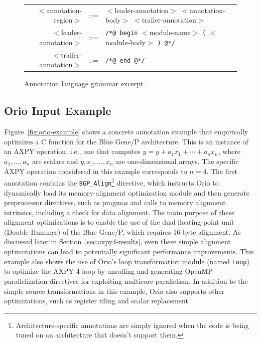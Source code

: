 \begin{figure}%
\begin{center} 
\begin{tabular}{rrl} 
$<$annotation-region$>$ & ::= & $<$leader-annotation$>$ $<$annotation-body$>$ $<$trailer-annotation$>$\\ 
$<$leader-annotation$>$ & ::= & \texttt{/*@ begin} $<$module-name$>$ \texttt{(} $<$module-body$>$ \texttt{) @*/} \\
$<$trailer-annotation$>$ & ::= & \texttt{/*@ end @*/} \\
\end{tabular} 
\end{center}  
\caption{Annotation language grammar excerpt.}  
\label{fig:ann-lang}
\end{figure}  

\subsection{Orio Input Example}
\label{sec:example}

Figure~\ref{fig:orio-example} shows a concrete annotation example that
empirically optimizes a C function for the Blue Gene/P
architecture. This is an instance of an AXPY operation, i.e., one that computes
$y=y+a_1 x_1+\cdots+a_n x_n$, where $a_1,\ldots,a_n$ are scalars and
$y,x_1,\ldots,x_n$ are one-dimensional arrays. The specific AXPY operation
considered in this example corresponds to $n=4$. The first annotation contains the
\texttt{BGP\_Align}\footnote{Architecture-specific annotations are simply ignored when the
code is being tuned on an architecture that doesn't support them.} directive,
which instructs Orio to dynamically load its memory-alignment optimization
module and then generate preprocessor directives, such as pragmas and calls
to memory alignment intrinsics, including a check for data alignment. The
main purpose of these alignment optimizations is to enable the use of the
dual floating-point unit (Double Hummer) of the Blue Gene/P, which requires
16-byte alignment. As discussed later in Section~\ref{sec:axpy4-results},
even these simple alignment optimizations can lead to potentially significant
performance improvements. This example also shows the use of Orio's loop
transformation module (named \texttt{Loop}) to optimize the AXPY-4 loop by
unrolling and generating OpenMP parallelization directives for exploiting
multicore parallelism. In addition to the simple source transformations in
this example, Orio also supports other optimizations, such as register
tiling and scalar replacement.

